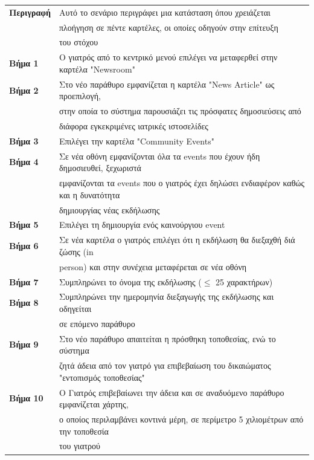 \documentclass{article}
\newcommand\T{\rule{0pt}{2.6ex}}       %
\newcommand\B{\rule[-1.2ex]{0pt}{0pt}}
\begin{document}
 \begin{center}
     \begin{tabular}{|l|l|}
     \hline
      \textbf{Περιγραφή} & Αυτό το σενάριο περιγράφει μια κατάσταση όπου χρειάζεται \T \\& πλοήγηση σε πέντε καρτέλες, οι οποίες οδηγούν στην επίτευξη \\& του στόχου \B \\ 
      \hline
      \textbf{Βήμα 1} & Ο γιατρός από το κεντρικό μενού επιλέγει να μεταφερθεί στην καρτέλα "Newsroom" \T\B \\
      \hline
      \textbf{Βήμα 2} & Στο νέο παράθυρο εμφανίζεται η καρτέλα "News Article" ως προεπιλογή, \T \\& στην οποία το σύστημα παρουσιάζει τις πρόσφατες δημοσιεύσεις από \\& διάφορα εγκεκριμένες ιατρικές ιστοσελίδες \B \\
      \hline
      \textbf{Βήμα 3} & Επιλέγει την καρτέλα "Community Events" \T\B \\
      \hline
      \textbf{Βήμα 4} & Σε νέα οθόνη εμφανίζονται όλα τα events που έχουν ήδη δημοσιευθεί, ξεχωριστά\T \\ & εμφανίζονται τα events που ο γιατρός έχει δηλώσει ενδιαφέρον καθώς  και η δυνατότητα \\& δημιουργίας νέας εκδήλωσης\B \\
      \hline
      \textbf{Βήμα 5} & Επιλέγει τη δημιουργία ενός καινούργιου event \T\B \\
      \hline
      \textbf{Βήμα 6} & Σε νέα καρτέλα ο γιατρός επιλέγει ότι η εκδήλωση θα διεξαχθή διά ζώσης (in \T \\& person) και στην συνέχεια μεταφέρεται σε νέα οθόνη \B\\
      \hline
      \textbf{Βήμα 7} & Συμπληρώνει το όνομα της εκδήλωσης ($\le$ 25 χαρακτήρων) \T\B \\
      \hline
      \textbf{Βήμα 8} & Συμπληρώνει την ημερομηνία διεξαγωγής της εκδήλωσης και οδηγείται \T \\& σε επόμενο παράθυρο \B \\
      \hline
      \textbf{Βήμα 9} & Στο νέο παράθυρο απαιτείται η πρόσθηκη τοποθεσίας, ενώ το σύστημα \T \\& ζητά άδεια από τον γιατρό για επιβεβαίωση του δικαιώματος "εντοπισμός τοποθεσίας" \B \\
      \hline
       \textbf{Βήμα 10} & Ο Γιατρός επιβεβαίωνει την άδεια και σε αναδυόμενο παράθυρο εμφανίζεται χάρτης, \T \\& ο οποίος περιλαμβάνει κοντινά μέρη, σε περίμετρο 5 χιλιομέτρων από την τοποθεσία \\& του γιατρού \B \\

\end{tabular}
\end{center}
\end{document}
